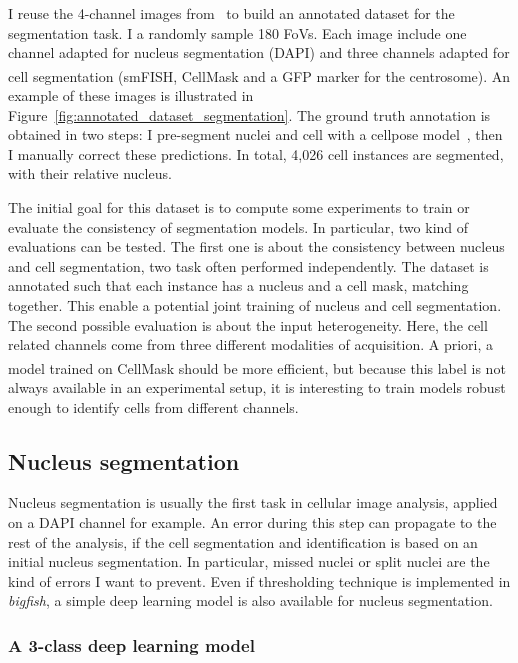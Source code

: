 I reuse the 4-channel images from~\cite{safieddine_choreography_2021} to build an annotated dataset for the segmentation task.
I a randomly sample 180 \ac{FoV}s.
Each image include one channel adapted for nucleus segmentation (DAPI) and three channels adapted for cell segmentation (\ac{smFISH}, CellMask\textsuperscript{\texttrademark} and a \ac{GFP} marker for the centrosome).
An example of these images is illustrated in Figure~\ref{fig:annotated_dataset_segmentation}.
The ground truth annotation is obtained in two steps: I pre-segment nuclei and cell with a cellpose model~\cite{stringer_cellpose_2021}, then I manually correct these predictions.
In total, 4,026 cell instances are segmented, with their relative nucleus.

The initial goal for this dataset is to compute some experiments to train or evaluate the consistency of segmentation models.
In particular, two kind of evaluations can be tested.
The first one is about the consistency between nucleus and cell segmentation, two task often performed independently.
The dataset is annotated such that each instance has a nucleus and a cell mask, matching together.
This enable a potential joint training of nucleus and cell segmentation.
The second possible evaluation is about the input heterogeneity.
Here, the cell related channels come from three different modalities of acquisition.
A priori, a model trained on CellMask\textsuperscript{\texttrademark} should be more efficient, but because this label is not always available in an experimental setup, it is interesting to train models robust enough to identify cells from different channels.

\subsection{Nucleus segmentation}
\label{subsec:segmentation_nuc}

Nucleus segmentation is usually the first task in cellular image analysis, applied on a DAPI channel for example.
An error during this step can propagate to the rest of the analysis, if the cell segmentation and identification is based on an initial nucleus segmentation.
In particular, missed nuclei or split nuclei are the kind of errors I want to prevent.
Even if thresholding technique is implemented in \emph{bigfish}, a simple deep learning model is also available for nucleus segmentation.

\subsubsection{A 3-class deep learning model}

